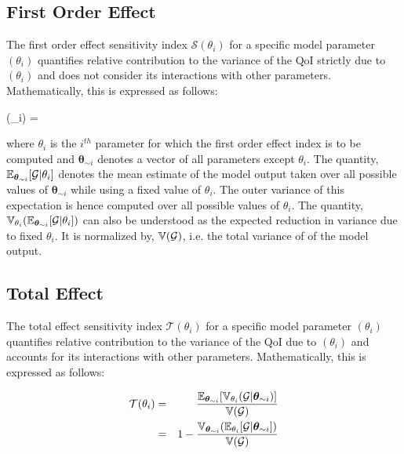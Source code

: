 \subsection{First Order Effect}

The first order effect sensitivity index $\mathcal{S}(\theta_{i})$ for a specific model
parameter $(\theta_{i})$ quantifies relative contribution to the variance of the QoI
strictly due to $(\theta_{i})$ and does not consider its interactions with other parameters.
Mathematically, this is expressed as follows:

\be
{}(\theta_{i}) = 
\ee

\noindent where $\theta_{i}$ is the $i^{th}$ parameter for which the first order effect index is to be
computed and $\bm \theta_{\sim i}$ denotes a vector of all parameters except $\theta_{i}$. The quantity,
$\operatorname{\mathbb{E}}_{\bm \theta_{\sim i}}[\mathcal{G}\vert\theta_{i}]$ denotes the mean estimate of the model output
taken over all possible values of $\bm \theta_{\sim i}$ while using a fixed value of $\theta_{i}$. The
outer variance of this expectation is hence computed over all possible values of $\theta_{i}$.
The quantity, $\operatorname{\mathbb{V}}_{\theta_{i}}(\operatorname{\mathbb{E}}_{\bm \theta_{\sim i}}[\mathcal{G}\vert\theta_{i}])$ can also be
understood as the expected reduction in variance due to fixed $\theta_{i}$.
It is normalized by, $\operatorname{\mathbb{V}}(\mathcal{G})$, i.e. the total variance of of the model output.

\subsection{Total Effect}

The total effect sensitivity index $\mathcal{T}(\theta_{i})$ for a specific model
parameter $(\theta_{i})$ quantifies relative contribution to the variance of the QoI
due to $(\theta_{i})$ and accounts for its interactions with other parameters.
Mathematically, this is expressed as follows:

\begin{eqnarray}
\mathcal{T}(\theta_{i}) &=& \frac{\E_{\bm \theta_{\sim i}}[\V_{\theta_{i}}(\mathcal{G}\vert\bm{\theta}_{\sim i})]}{\V(\mathcal{G})} \\ \vspace{1mm}
			&=& 1 - \frac{\V_{\bm \theta_{\sim i}}(\E_{\theta_{i}}[\mathcal{G}\vert\bm\theta_{\sim i}])}{\V(\mathcal{G})}
\end{eqnarray}

